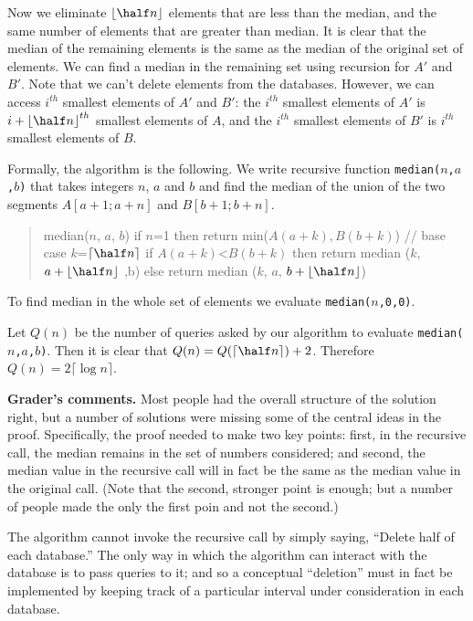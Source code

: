 \documentclass[12pt]{article}
\newcommand{\cel}[1]{
{\lceil {#1} \rceil}
}
\newcommand{\flr}[1]{
{\lfloor {#1} \rfloor}
}
\begin{document}
\begin{enumerate}
{Now we eliminate $\flr{\half n}$ elements that are less than the median,
and the same number of elements that are greater than median.
It is clear that the
median of the remaining elements is the same as 
the median of the original set of   
elements.
We can find a median in the remaining set 
using recursion for $A'$ and $B'$.    
Note that we can't delete elements from the databases.
However, we can access $i^{th}$ smallest elements of $A'$ and $B'$:
the $i^{th}$ smallest elements of $A'$ is $i+\flr{\half n }^{th}$ smallest 
elements of $A$, and
the $i^{th}$ smallest elements of $B'$ is $i^{th}$ smallest
elements of $B$.

Formally, the algorithm is the following.
We write recursive function {\tt median($n$,$a$,$b$)}
that takes integers $n$, $a$ and $b$  and
find the median of the union of the two segments $A[a+1; a+n]$ and
$B[b+1; b+n]$.

\begin{quote}
\begin{code}
median($n$, $a$, $b$)
   if $n$=1 then return min($A(a+k),B(b+k)$) // base case
   $k$=$\cel{\half n }$
   if $A(a+k)$<$B(b+k)$
     then return median ($k$, $a+\flr{\half n }$ ,b)
     else return median ($k$, $a$, $b+\flr{\half n }$)
\end{code}
\end{quote}

To find median in the whole set of elements we evaluate
{\tt median($n$,0,0)}.

Let $Q(n)$ be the number of queries asked by our algorithm to evaluate
{\tt median($n$,$a$,$b$)}.
Then it is clear that $Q(n)=Q(\cel{\half n })+2$.
Therefore $Q(n)=2\cel{\log n}$.

\bigskip

\noindent
{\bf Grader's comments.} 
Most people had the overall structure of the solution right,
but a number of solutions were missing some of the central
ideas in the proof.  Specifically, the proof needed to 
make two key points: first, in the recursive call, the
median remains in the set of numbers considered;
and second, the median value in the recursive call
will in fact be the same as the median value in
the original call.  (Note that the second, stronger point is
enough; but a number of people made the only the first 
poin and not the second.)

The algorithm cannot invoke the recursive call by
simply saying, ``Delete half of each database.''  The only way
in which the algorithm can interact with the database is
to pass queries to it; and so a conceptual ``deletion''
must in fact be implemented by keeping track of a particular
interval under consideration in each database.

}
\end{enumerate}
\end{document}
